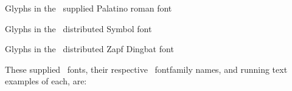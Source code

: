 \begin{table}
\centering
\caption{Glyphs in the \ltx\ supplied Palatino roman font}\label{tab:palatinoglyphs}
\nohexoct
{}
\end{table}

\begin{table}
\centering
\caption{Glyphs in the \ltx\ distributed Symbol font}\label{tab:symbolglyphs}
\nohexoct
{}
\end{table}

\begin{table}
\centering
\caption{Glyphs in the \ltx\ distributed Zapf Dingbat font}\label{tab:dingglyphs}
\nohexoct
{}
\end{table}


These supplied \pscript\ fonts, their respective \ltx\ fontfamily names,
and running text examples of each, are:
